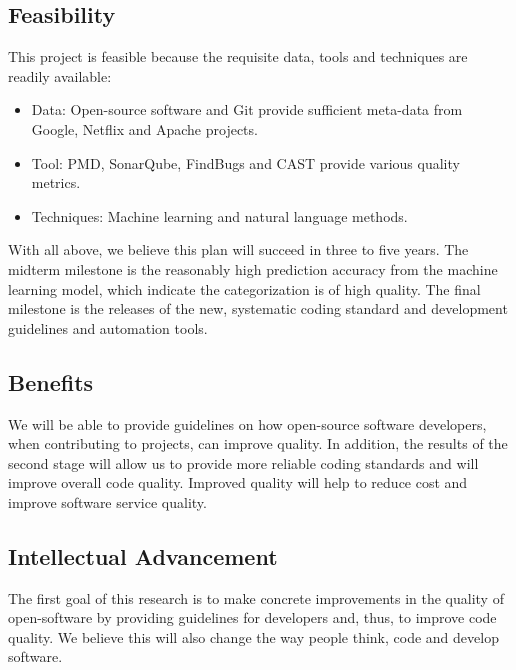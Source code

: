 \subsection{Feasibility}
This project is feasible because the requisite data, tools and techniques are readily available:
\begin{itemize}
    \item Data: Open-source software and Git provide sufficient meta-data from Google, Netflix and Apache projects.
    \item Tool: PMD, SonarQube, FindBugs and CAST provide various quality metrics.
    \item Techniques: Machine learning and natural language methods.
\end{itemize}
With all above, we believe this plan will succeed in three to five years.
The midterm milestone is the reasonably high prediction accuracy from the machine learning model, which indicate the categorization is of high quality.
The final milestone is the releases of the new, systematic coding standard and development guidelines and automation tools.

\subsection{Benefits}

We will be able to provide guidelines on how open-source software developers, when contributing to projects,  can improve quality. 
In addition, the results of the second stage will allow us to provide more reliable coding standards and will improve overall code quality.
Improved quality will help to reduce cost and improve software service quality.

\subsection{Intellectual Advancement}

The first goal of this research is to make concrete improvements in the quality of open-software by providing guidelines for developers and, thus, to improve code quality. 
We believe this will also change the way people think, code and develop software.
